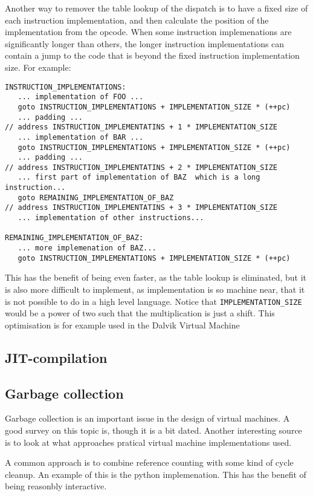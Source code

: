 Another way to remover the table lookup of the dispatch is to have a fixed size of each instruction implementation, and then calculate the position of the implementation from the opcode. When some instruction implemenations are significantly longer than others, the longer instruction implementations can contain a jump to the code that is beyond the fixed instruction implementation size.
For example:
\begin{verbatim}
INSTRUCTION_IMPLEMENTATIONS:
   ... implementation of FOO ...
   goto INSTRUCTION_IMPLEMENTATIONS + IMPLEMENTATION_SIZE * (++pc)
   ... padding ...
// address INSTRUCTION_IMPLEMENTATINS + 1 * IMPLEMENTATION_SIZE
   ... implementation of BAR ...
   goto INSTRUCTION_IMPLEMENTATIONS + IMPLEMENTATION_SIZE * (++pc)
   ... padding ...
// address INSTRUCTION_IMPLEMENTATINS + 2 * IMPLEMENTATION_SIZE
   ... first part of implementation of BAZ  which is a long instruction...
   goto REMAINING_IMPLEMENTATION_OF_BAZ
// address INSTRUCTION_IMPLEMENTATINS + 3 * IMPLEMENTATION_SIZE
   ... implementation of other instructions...

REMAINING_IMPLEMENTATION_OF_BAZ:
   ... more implemenation of BAZ...
   goto INSTRUCTION_IMPLEMENTATIONS + IMPLEMENTATION_SIZE * (++pc)
\end{verbatim}
This has the benefit of being even faster, as the table lookup is eliminated,
but it is also more difficult to implement, as implementation is so 
machine near, that it is not possible to do in a high level language.
Notice that \verb|IMPLEMENTATION_SIZE| would be a power of two such that the multiplication is just a shift.
This optimisation is for example used in the Dalvik Virtual Machine\cite{dalvik-vm}


\subsection{JIT-compilation}
\subsection{Garbage collection}
Garbage collection is an important issue in the design of virtual machines. 
A good survey on this topic is\cite{gc-survey}, though it is a bit dated.
Another interesting source is to look at what approaches pratical virtual machine implementations used.

A common approach is to combine reference counting with some kind of cycle cleanup. 
An example of this is the python implemenation. 
This has the benefit of being reasonbly interactive. 

